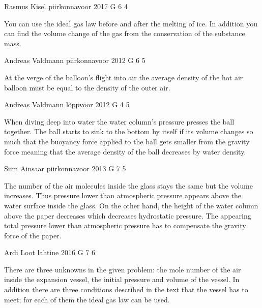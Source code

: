 \documentclass[11pt]{article}
\begin{document}
{Rasmus Kisel} %
{piirkonnavoor} %
{2017} %
{G 6} %
{4} %
{

\ifEngHint
You can use the ideal gas law before and after the melting of ice. In addition you can find the volume change of the gas from the conservation of the substance mass.
\fi
}

{Andreas Valdmann} %
{piirkonnavoor} %
{2012} %
{G 6} %
{5} %
{

\ifEngHint
At the verge of the balloon's flight into air the average density of the hot air balloon must be equal to the density of the outer air.
\fi
}

{Andreas Valdmann} %
{lõppvoor} %
{2012} %
{G 4} %
{5} %
{

\ifEngHint
When diving deep into water the water column's pressure presses the ball together. The ball starts to sink to the bottom by itself if its volume changes so much that the buoyancy force applied to the ball gets smaller from the gravity force meaning that the average density of the ball decreases by water density.
\fi
}

{Siim Ainsaar} %
{piirkonnavoor} %
{2013} %
{G 7} %
{5} %
{

\ifEngHint
The number of the air molecules inside the glass stays the same but the volume increases. Thus pressure lower than atmospheric pressure appears above the water surface inside the glass. On the other hand, the height of the water column above the paper decreases which decreases hydrostatic pressure. The appearing total pressure lower than atmospheric pressure has to compensate the gravity force of the paper.
\fi
}

{Ardi Loot} %
{lahtine} %
{2016} %
{G 7} %
{6} %
{

\ifEngHint
There are three unknowns in the given problem: the mole number of the air inside the expansion vessel, the initial pressure and volume of the vessel. In addition there are three conditions described in the text that the vessel has to meet; for each of them the ideal gas law can be used.
\fi
}
\end{document}
